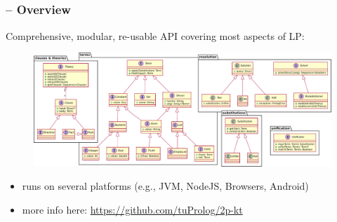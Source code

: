 \documentclass[presentation]{beamer}
\begin{document}
\subsection{\twopkt{}}

\begin{frame}%
    \frametitle{\twopkt{} -- Overview}

    Comprehensive, modular, re-usable API covering most aspects of LP:
    \begin{figure}
        \includegraphics[width=\linewidth]{img/2p-kt-overview}
    \end{figure}
    \begin{itemize}
        \item runs on several platforms (e.g., JVM, NodeJS, Browsers, Android)
        \item more info here: \url{https://github.com/tuProlog/2p-kt}
    \end{itemize}

\end{frame}
\end{document}

